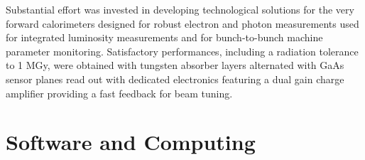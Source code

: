 \documentclass[%
 reprint,
 amsmath,amssymb,
 aps,
]{revtex4-1}
\newcommand{\todo}[1]{\textcolor{red}{{#1}}}
\begin{document}
Substantial effort was invested in developing technological solutions for the very forward calorimeters designed for robust electron and photon measurements used for integrated luminosity measurements and for bunch-to-bunch machine parameter monitoring. Satisfactory performances, including a radiation tolerance to 1 MGy, were obtained with tungsten absorber layers alternated with GaAs sensor planes read out with dedicated electronics featuring a dual gain charge amplifier providing a fast feedback for beam tuning.


\section{\label{sec:soft}Software and Computing}
\end{document}
